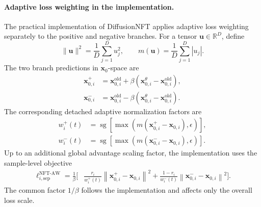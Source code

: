 \documentclass{article} %
\begin{document}
\paragraph{Adaptive loss weighting in the implementation.}
The practical implementation of DiffusionNFT applies adaptive loss weighting
separately to the positive and negative branches. For a tensor
$\mathbf{u}\in\mathbb{R}^{D}$, define
\begin{equation}
\|\mathbf{u}\|^2
=
\frac{1}{D}\sum_{j=1}^{D}u_j^2,
\qquad
m(\mathbf{u})
=
\frac{1}{D}\sum_{j=1}^{D}|u_j|.
\end{equation}
The two branch predictions in $\mathbf{x}_0$-space are
\begin{align}
\mathbf{x}_{0,i}^{+}
&=
\mathbf{x}_{0,i}^{\mathrm{old}}
+
\beta
\left(
\mathbf{x}_{0,i}^{\theta}
-
\mathbf{x}_{0,i}^{\mathrm{old}}
\right),
\\
\mathbf{x}_{0,i}^{-}
&=
\mathbf{x}_{0,i}^{\mathrm{old}}
-
\beta
\left(
\mathbf{x}_{0,i}^{\theta}
-
\mathbf{x}_{0,i}^{\mathrm{old}}
\right).
\end{align}
The corresponding detached adaptive normalization factors are
\begin{align}
w_i^{+}(t)
&=
\operatorname{sg}
\left[
\max
\left(
m\left(
\mathbf{x}_{0,i}^{+}
-
\mathbf{x}_{0,i}
\right),
\epsilon
\right)
\right],
\\
w_i^{-}(t)
&=
\operatorname{sg}
\left[
\max
\left(
m\left(
\mathbf{x}_{0,i}^{-}
-
\mathbf{x}_{0,i}
\right),
\epsilon
\right)
\right].
\label{eq:origin-weight-factor}
\end{align}
Up to an additional global advantage scaling factor, the implementation uses
the sample-level objective
\begin{align}
\label{eq:nft_adaptive_separate}
\ell_{i,\mathrm{sep}}^{\mathrm{NFT\text{-}AW}}
=
\frac{1}{\beta}
\Bigg[
&
\frac{r_i}{w_i^{+}(t)}
\left\|
\mathbf{x}_{0,i}^{+}
-
\mathbf{x}_{0,i}
\right\|^2
+
\frac{1-r_i}{w_i^{-}(t)}
\left\|
\mathbf{x}_{0,i}^{-}
-
\mathbf{x}_{0,i}
\right\|^2
\Bigg].
\end{align}
The common factor $1/\beta$ follows the implementation and affects only the
overall loss scale.
\end{document}
